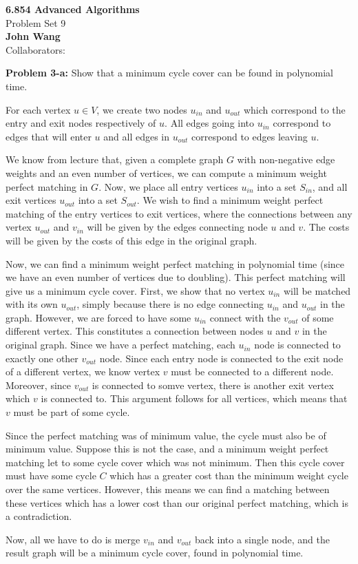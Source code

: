 \documentclass[psamsfonts]{amsart}
\newenvironment{sol}{\vspace{0.25cm}{\large \bfseries Solution:}}{\qedsymbol}
\newenvironment{prob}[1]{\begin{framed}{\large \bfseries Problem #1:}}{\end{framed}}
\newcommand{\makenewtitle}{
    \begin{center}
    {\huge \bfseries 6.854 Advanced Algorithms} \\
    Problem Set 9\\
    \vspace{0.25cm}
    {\bfseries John Wang} \\
    Collaborators:  
    \end{center}
    \vspace{0.5cm}
}
\begin{document}
\newpage
\makenewtitle

\begin{prob}{3-a}
Show that a minimum cycle cover can be found in polynomial time.
\end{prob}
\begin{sol}
For each vertex $u \in V$, we create two nodes $u_{in}$ and $u_{out}$ which correspond to the entry and exit nodes respectively of $u$. All edges going into $u_{in}$ correspond to edges that will enter $u$ and all edges in $u_{out}$ correspond to edges leaving $u$.

We know from lecture that, given a complete graph $G$ with non-negative edge weights and an even number of vertices, we can compute a minimum weight perfect matching in $G$. Now, we place all entry vertices $u_{in}$ into a set $S_{in}$, and all exit vertices $u_{out}$ into a set $S_{out}$. We wish to find a minimum weight perfect matching of the entry vertices to exit vertices, where the connections between any vertex $u_{out}$ and $v_{in}$ will be given by the edges connecting node $u$ and $v$. The costs will be given by the costs of this edge in the original graph. 

Now, we can find a minimum weight perfect matching in polynomial time (since we have an even number of vertices due to doubling). This perfect matching will give us a minimum cycle cover. First, we show that no vertex $u_{in}$ will be matched with its own $u_{out}$, simply because there is no edge connecting $u_{in}$ and $u_{out}$ in the graph. However, we are forced to have some $u_{in}$ connect with the $v_{out}$ of some different vertex. This constitutes a connection between nodes $u$ and $v$ in the original graph. Since we have a perfect matching, each $u_{in}$ node is connected to exactly one other $v_{out}$ node. Since each entry node is connected to the exit node of a different vertex, we know vertex $v$ must be connected to a different node. Moreover, since $v_{out}$ is connected to somve vertex, there is another exit vertex which $v$ is connected to. This argument follows for all vertices, which means that $v$ must be part of some cycle. 

Since the perfect matching was of minimum value, the cycle must also be of minimum value. Suppose this is not the case, and a minimum weight perfect matching let to some cycle cover which was not minimum. Then this cycle cover must have some cycle $C$ which has a greater cost than the minimum weight cycle over the same vertices. However, this means we can find a matching between these vertices which has a lower cost than our original perfect matching, which is a contradiction.

Now, all we have to do is merge $v_{in}$ and $v_{out}$ back into a single node, and the result graph will be a minimum cycle cover, found in polynomial time.
\end{sol}
\end{document}
